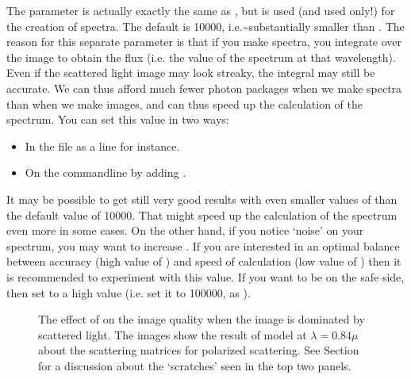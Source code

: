 \documentclass[letterpaper,10pt,english]{sphinxmanual}
\begin{document}
\begin{itemize}
The parameter  is actually exactly the same as
, but is used (and used only!) for the creation of
spectra. The default is 10000, i.e.\textasciitilde{}substantially smaller than .
The reason for this separate parameter is that if you make
spectra, you integrate over the image to obtain the flux (i.e. the value of
the spectrum at that wavelength). Even if the scattered light image may
look streaky, the integral may still be accurate. We can thus afford much
fewer photon packages when we make spectra than when we make images, and
can thus speed up the calculation of the spectrum. You can set this value
in two ways:
\begin{itemize}
\item {} 
In the  file as a line  for instance.

\item {} 
On the command\sphinxhyphen{}line by adding .

\end{itemize}

 It may be possible to get still very good results with even
smaller values of  than the default value of
10000. That might speed up the calculation of the spectrum even more in some
cases. On the other hand, if you notice ‘noise’ on your spectrum, you may want
to increase . If you are interested in an optimal balance
between accuracy (high value of ) and speed of calculation (low
value of ) then it is recommended to experiment with this value.
If you want to be on the safe side, then set  to a high value
(i.e. set it to 100000, as ).

\end{itemize}

\begin{figure}[htbp]
\centering
\capstart

\noindent{}
\caption{The effect of  on the image quality when the image is dominated
by scattered light. The images show the result of model
 at \(\lambda=0.84\mu\) about the
scattering matrices for polarized scattering. See Section
{\hyperref[\detokenize{dustradtrans:sec-single-multiple-scattering}]{}} for a discussion about the ‘scratches’
seen in the top two panels.}\label{\detokenize{dustradtrans:id1}}\label{\detokenize{dustradtrans:fig-polscat}}\end{figure}
\end{document}

